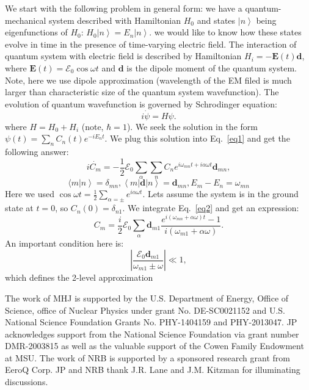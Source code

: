 \documentclass[%
 reprint,
 amsmath,amssymb,
 aps,
]{revtex4-2}
\newcommand\abs[1]{\left|#1\right|}
\newcommand\bra[1]{\left| #1 \right \rangle}
\newcommand\ket[1]{\left \langle #1 \right |}
\begin{document}
We start with the following problem in general form: we have a quantum-mechanical system described with Hamiltonian $H_0$ and states $\bra{n}$ being eigenfunctions of $H_0$: $H_0 \bra{n} = E_n \bra{n}$. we would like to know how these states evolve in time in the presence of time-varying electric field. The interaction of quantum system with electric field is described by Hamiltonian $ H_i = - \mathbf{E}(t) \mathbf{d}$, where $\mathbf{E}(t) = \mathbf{\mathcal{E}}_0 \cos \omega t$ and $\mathbf{d}$ is the dipole moment of the quantum system. Note, here we use dipole approximation (wavelength of the EM filed is much larger than characteristic size of the quantum system wavefunction). The evolution of quantum wavefunction is governed by Schrodinger equation:
\begin{equation}
 i \dot{\psi} = H \psi
\label{eq1}.
\end{equation}
where $H = H_0 + H_i$ (note, $\hbar = 1$). We seek the solution in the form $\psi(t) = \sum_n C_n(t) e^{-i E_n t}$. We plug this solution into Eq.~\ref{eq1} and get the following answer:
\begin{equation}
 i \dot{C_m} = -\frac{1}{2} \mathbf{\mathcal{E}}_0 \sum_{\alpha} \sum_{n} C_n e^{i \omega_{mn} t + i \alpha \omega t} \mathbf{d}_{mn}
\label{eq2},
\end{equation}
\begin{equation}
 \langle m\bra{n} = \delta_{mn}, \ket{m} \mathbf{d} \bra{n} = \mathbf{d}_{mn}, E_m - E_n = \omega_{mn}
\end{equation}
Here we used $\cos \omega t = \frac{1}{2} \sum_{\alpha = \pm} e^{i \alpha \omega t}$. Lets assume the system is in the ground state at $t = 0$, so $C_n(0) = \delta_{n1}$. We integrate Eq.~\ref{eq2} and get an expression:
\begin{equation}
 C_m = \frac{i}{2} \mathbf{\mathcal{E}}_0 \sum_{\alpha} \mathbf{d}_{m1} \frac{e^{i (\omega_{mn} + \alpha \omega) t} - 1}{i (\omega_{m1} + \alpha \omega)} 
\label{eq3}.
\end{equation}
An important condition here is:
\begin{equation}
\abs{\frac{\mathbf{\mathcal{E}}_0 \mathbf{d}_{m1}}{\omega_{m1} \pm \omega}} \ll 1
\label{eq4},
\end{equation}
which defines the 2-level approximation

\begin{acknowledgments}

The work of MHJ is supported by the U.S. Department of Energy, Office of Science, office of Nuclear Physics under grant No. DE-SC0021152 and U.S. National Science Foundation Grants No. PHY-1404159 and PHY-2013047. JP acknowledges support from the National Science Foundation via grant number DMR-2003815 as well as the valuable support of the Cowen Family Endowment at MSU. The work of NRB is supported by a sponsored research grant from EeroQ Corp. JP and NRB thank J.R. Lane and J.M. Kitzman for illuminating discussions.
\end{acknowledgments}
\end{document}
